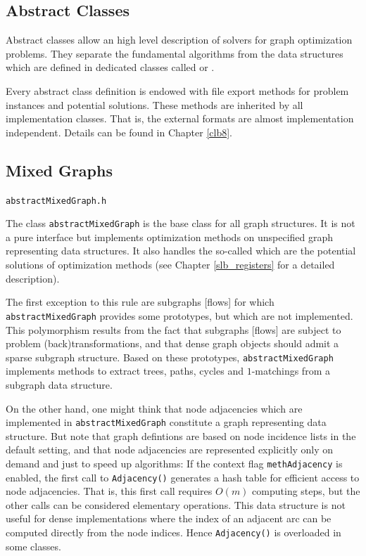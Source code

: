 \documentclass[a4paper,11pt,twoside]{book}
\begin{document}
\begin{multicols}{2}
\section{Abstract Classes}

Abstract classes allow an high level description of solvers for graph
optimization problems. They separate the fundamental algorithms from the data
structures which are defined in dedicated classes called
 or .

Every abstract class definition is endowed with file export methods for problem
instances and potential solutions. These methods are inherited by all
implementation classes. That is, the external formats are almost implementation
independent. Details can be found in Chapter \ref{clb8}.


\subsection{Mixed Graphs}
\label{slb211}
\myinclude\verb/abstractMixedGraph.h/

\bigskip\noindent
The class \verb/abstractMixedGraph/ is the base class for all graph structures.
It is not a pure interface but implements optimization methods on unspecified graph
representing data structures. It also handles the so-called  which are the
potential solutions of optimization methods (see Chapter \ref{slb_registers} for
a detailed description).

The first exception to this rule are subgraphs [flows] for which
\verb/abstractMixedGraph/ provides some prototypes, but which are not implemented.
This polymorphism results from the fact that subgraphs [flows] are subject to
problem (back)transformations, and that dense graph objects
should admit a sparse subgraph structure. Based on these prototypes,
\verb/abstractMixedGraph/ implements methods to extract trees, paths, cycles
and $1$-matchings from a subgraph data structure.

On the other hand, one might think that node adjacencies which are implemented in
\verb/abstractMixedGraph/ constitute a graph representing data structure.
But note that graph defintions are based on node incidence lists in the default
setting, and that node adjacencies are represented explicitly only on demand and
just to speed up algorithms:
If the context flag \verb/methAdjacency/ is enabled, the first call to
\verb/Adjacency()/ generates a hash table for efficient access to node adjacencies.
That is, this first call requires $O(m)$ computing steps, but the other calls can
be considered elementary operations. This data structure is not useful for dense
implementations where the index of an adjacent arc can be computed directly from
the node indices. Hence \verb/Adjacency()/ is overloaded in some classes.


\end{multicols}
\end{document}
